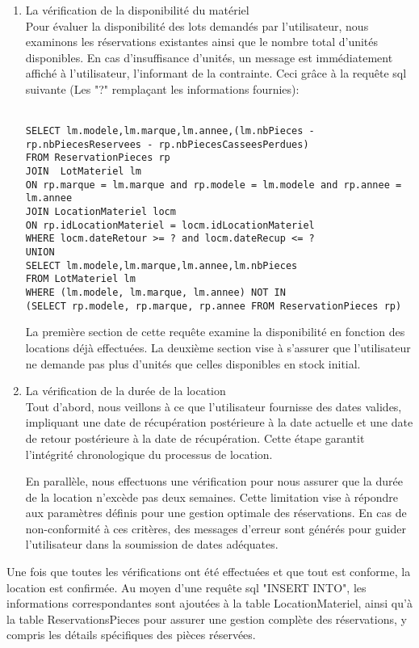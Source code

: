 \begin{enumerate}
    \item La vérification de la disponibilité du matériel\\
    Pour évaluer la disponibilité des lots demandés par l'utilisateur, nous examinons les réservations existantes ainsi que le nombre total d'unités disponibles. En cas d'insuffisance d'unités, un message est immédiatement affiché à l'utilisateur, l'informant de la contrainte.
    Ceci grâce à la requête sql suivante (Les "?" remplaçant les informations fournies): \\
    \\
    \begin{lstlisting}[style=SQL, label=sql-e]
SELECT lm.modele,lm.marque,lm.annee,(lm.nbPieces - rp.nbPiecesReservees - rp.nbPiecesCasseesPerdues)
FROM ReservationPieces rp
JOIN  LotMateriel lm 
ON rp.marque = lm.marque and rp.modele = lm.modele and rp.annee = lm.annee
JOIN LocationMateriel locm
ON rp.idLocationMateriel = locm.idLocationMateriel
WHERE locm.dateRetour >= ? and locm.dateRecup <= ?
UNION
SELECT lm.modele,lm.marque,lm.annee,lm.nbPieces
FROM LotMateriel lm 
WHERE (lm.modele, lm.marque, lm.annee) NOT IN
(SELECT rp.modele, rp.marque, rp.annee FROM ReservationPieces rp)
    \end{lstlisting}
    La première section de cette requête examine la disponibilité en fonction des locations déjà effectuées. La deuxième section vise à s'assurer que l'utilisateur ne demande pas plus d'unités que celles disponibles en stock initial.
    \item La vérification de la durée de la location\\
    Tout d'abord, nous veillons à ce que l'utilisateur fournisse des dates valides, impliquant une date de récupération postérieure à la date actuelle et une date de retour postérieure à la date de récupération. Cette étape garantit l'intégrité chronologique du processus de location.
    
    En parallèle, nous effectuons une vérification pour nous assurer que la durée de la location n'excède pas deux semaines. Cette limitation vise à répondre aux paramètres définis pour une gestion optimale des réservations. En cas de non-conformité à ces critères, des messages d'erreur sont générés pour guider l'utilisateur dans la soumission de dates adéquates.
\end{enumerate}
Une fois que toutes les vérifications ont été effectuées et que tout est conforme, la location est confirmée. Au moyen d'une requête sql "INSERT INTO", les informations correspondantes sont ajoutées à la table LocationMateriel, ainsi qu'à la table ReservationsPieces pour assurer une gestion complète des réservations, y compris les détails spécifiques des pièces réservées.

